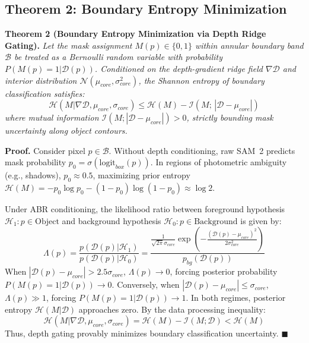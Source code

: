 \documentclass[10pt,twocolumn,letterpaper]{article}
\begin{document}
\subsection{Theorem 2: Boundary Entropy Minimization}
\textbf{Theorem 2 (Boundary Entropy Minimization via Depth Ridge Gating).} \textit{Let the mask assignment $M(p) \in \{0, 1\}$ within annular boundary band $\mathcal{B}$ be treated as a Bernoulli random variable with probability $P(M(p) = 1 | \mathcal{D}(p))$. Conditioned on the depth-gradient ridge field $\nabla \mathcal{D}$ and interior distribution $\mathcal{N}(\mu_{core}, \sigma_{core}^2)$, the Shannon entropy of boundary classification satisfies:}
\begin{equation}
\mathcal{H}(M | \nabla \mathcal{D}, \mu_{core}, \sigma_{core}) \le \mathcal{H}(M) - \mathcal{I}(M; \, |\mathcal{D} - \mu_{core}|)
\end{equation}
\textit{where mutual information $\mathcal{I}(M; |\mathcal{D} - \mu_{core}|) > 0$, strictly bounding mask uncertainty along object contours.}

\textbf{Proof.} Consider pixel $p \in \mathcal{B}$. Without depth conditioning, raw SAM~2 predicts mask probability $p_0 = \sigma(\mathrm{logit}_{box}(p))$. In regions of photometric ambiguity (e.g., shadows), $p_0 \approx 0.5$, maximizing prior entropy $\mathcal{H}(M) = -p_0 \log p_0 - (1-p_0)\log(1-p_0) \approx \log 2$.

Under ABR conditioning, the likelihood ratio between foreground hypothesis $\mathcal{H}_1: p \in \text{Object}$ and background hypothesis $\mathcal{H}_0: p \in \text{Background}$ is given by:
\begin{equation}
\Lambda(p) = \frac{p(\mathcal{D}(p) | \mathcal{H}_1)}{p(\mathcal{D}(p) | \mathcal{H}_0)} = \frac{\frac{1}{\sqrt{2\pi}\sigma_{core}}\exp\left(-\frac{(\mathcal{D}(p)-\mu_{core})^2}{2\sigma_{core}^2}\right)}{p_{bg}(\mathcal{D}(p))}
\end{equation}
When $|\mathcal{D}(p) - \mu_{core}| > 2.5\sigma_{core}$, $\Lambda(p) \to 0$, forcing posterior probability $P(M(p)=1 | \mathcal{D}(p)) \to 0$. Conversely, when $|\mathcal{D}(p) - \mu_{core}| \le \sigma_{core}$, $\Lambda(p) \gg 1$, forcing $P(M(p)=1 | \mathcal{D}(p)) \to 1$. In both regimes, posterior entropy $\mathcal{H}(M | \mathcal{D})$ approaches zero. By the data processing inequality:
\begin{equation}
\mathcal{H}(M | \nabla \mathcal{D}, \mu_{core}, \sigma_{core}) = \mathcal{H}(M) - \mathcal{I}(M; \mathcal{D}) < \mathcal{H}(M)
\end{equation}
Thus, depth gating provably minimizes boundary classification uncertainty. $\blacksquare$
\end{document}
